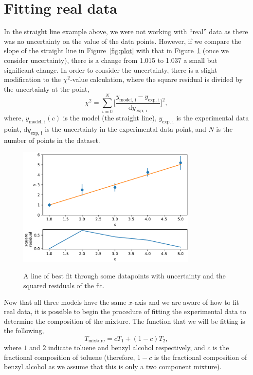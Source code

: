 \documentclass[a4paper]{article}
\begin{document}
\section{Fitting real data}
In the straight line example above, we were not working with ``real'' data as there was no uncertainty on the value of the data points. 
However, if we compare the slope of the straight line in Figure~\ref{fig:plot} with that in Figure~\ref{fig:plot_err} (once we consider uncertainty), there is a change from 1.015 to 1.037 a small but significant change. 
In order to consider the uncertainty, there is a slight modification to the $\chi^2$-value calculation, where the square residual is divided by the uncertainty at the point, 
%
\begin{equation}
  \chi^2 = \sum_{i=0}^{N}\bigg[{\frac{y_{\text{model, i}} - y_{\text{exp, i}}}{\text{d}y_{\text{exp, i}}}\bigg]^2},
  \label{equ:chi}
\end{equation}
%
where, $y_{\text{model, i}}(c)$ is the model (the straight line), $y_{\text{exp, i}}$ is the experimental data point, $\text{d}y_{\text{exp, i}}$ is the uncertainty in the experimental data point, and $N$ is the number of points in the dataset.
%
\begin{figure}[t]
  \centering
  \includegraphics[width=0.8\textwidth]{residual_err}
  \label{fig:plot_err}
  \caption{A line of best fit through some datapoints with uncertainty and the squared residuals of the fit.}
  \end{figure}
%

Now that all three models have the same $x$-axis and we are aware of how to fit real data, it is possible to begin the procedure of fitting the experimental data to determine the composition of the mixture. 
The function that we will be fitting is the following, 
%
\begin{equation}
  T_{\text{mixture}} = c T_{1} + (1 - c)T_{2},
  \label{equ:model}
\end{equation}
%
where $1$ and $2$ indicate toluene and benzyl alcohol respectively, and $c$ is the fractional composition of toluene (therefore, $1-c$ is the fractional composition of benzyl alcohol as we assume that this is only a two component mixture). 
\end{document}
